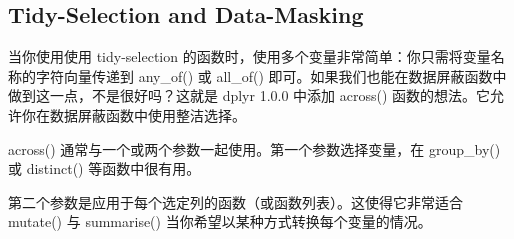 \subsection{Tidy-Selection and Data-Masking}
当你使用使用 tidy-selection 的函数时，使用多个变量非常简单：你只需将变量名称的字符向量传递到 any\_of() 或 all\_of() 即可。如果我们也能在数据屏蔽函数中做到这一点，不是很好吗？这就是 dplyr 1.0.0 中添加 across() 函数的想法。它允许你在数据屏蔽函数中使用整洁选择。

across() 通常与一个或两个参数一起使用。第一个参数选择变量，在 group\_by() 或 distinct() 等函数中很有用。

第二个参数是应用于每个选定列的函数（或函数列表）。这使得它非常适合 mutate() 与 summarise() 当你希望以某种方式转换每个变量的情况。